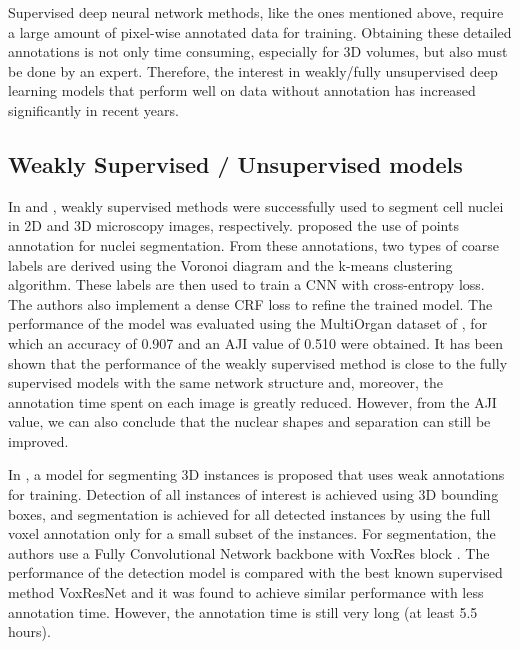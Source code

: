 Supervised deep neural network methods, like the ones mentioned above, require a large amount of pixel-wise annotated data for training. Obtaining these detailed annotations is not only time consuming, especially for \ac{3D} volumes, but also must be done by an expert. Therefore, the interest in weakly/fully unsupervised deep learning models that perform well on data without annotation has increased significantly in recent years.

\subsection{Weakly Supervised / Unsupervised models}

In \cite{weakly:2D} and \cite{weakly:3D}, weakly supervised methods were successfully used to segment cell nuclei in \ac{2D} and \ac{3D} microscopy images, respectively. \citet{weakly:2D} proposed the use of points annotation for nuclei segmentation. From these annotations, two types of coarse labels are derived using the Voronoi diagram and the k-means clustering algorithm. These labels are then used to train a \ac{CNN} with cross-entropy loss. The authors also implement a dense CRF loss to refine the trained model. The performance of the model was evaluated using the MultiOrgan dataset of \cite{CNN3}, for which an accuracy of 0.907 and an \ac{AJI} value of 0.510 were obtained. It has been shown that the performance of the weakly supervised method is close to the fully supervised models with the same network structure and, moreover, the annotation time spent on each image is greatly reduced. However, from the \ac{AJI} value, we can also conclude that the nuclear shapes and separation can still be improved.

In \cite{weakly:3D}, a model for segmenting \ac{3D} instances is proposed that uses weak annotations for training. Detection of all instances of interest is achieved using \ac{3D} bounding boxes, and segmentation is achieved for all detected instances by using the full voxel annotation only for a small subset of the instances. For segmentation, the authors use a Fully Convolutional Network backbone with VoxRes block \cite{voxresnet}. The performance of the detection model is compared with the best known supervised method VoxResNet \cite{voxresnet} and it was found to achieve similar performance with less annotation time. However, the annotation time is still very long (at least 5.5 hours).

